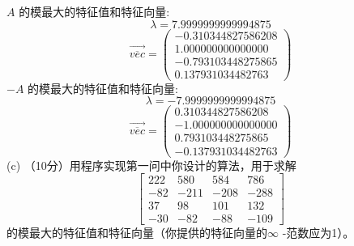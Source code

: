 \documentclass[12pt,a4paper,UTF8]{ctexart}
\begin{document}
\begin{enumerate}
          $A$ 的模最大的特征值和特征向量:
          \begin{equation}
              \lambda = 7.9999999999994875
          \end{equation}
          \begin{equation}
              \overrightarrow{\overline{vec}}=\left(\begin{array}{c}
                      -0.310344827586208 \\
                      1.000000000000000  \\
                      -0.793103448275865 \\
                      0.137931034482763
                  \end{array}\right)
          \end{equation}
          $-A$ 的模最大的特征值和特征向量:
          \begin{equation}
              \lambda = -7.9999999999994875
          \end{equation}
          \begin{equation}
              \overrightarrow{\overline{vec}} =\left(\begin{array}{c}
                      0.310344827586208  \\
                      -1.000000000000000 \\
                      0.793103448275865  \\
                      -0.137931034482763
                  \end{array}\right)
          \end{equation}
          (c) （10分）用程序实现第一问中你设计的算法，用于求解
          \begin{equation}
              \left[\begin{array}{rrrr}
                      222 & 580  & 584  & 786  \\
                      -82 & -211 & -208 & -288 \\
                      37  & 98   & 101  & 132  \\
                      -30 & -82  & -88  & -109
                  \end{array}\right]
          \end{equation}
          的模最大的特征值和特征向量（你提供的特征向量的$\infty$ -范数应为1）。


\end{enumerate}
\end{document}
